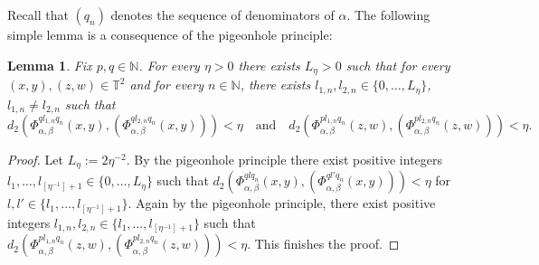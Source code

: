 \documentclass[10pt]{amsart}
\theoremstyle{definition}
\theoremstyle{plain}
\newtheorem{lemma}[definition]{Lemma}
\newcommand\NN{\mathbb{N}}
\newcommand\TT{\mathbb{T}}
\begin{document}
Recall that $(q_n)$ denotes the sequence of denominators of $\alpha$. The following simple lemma is a consequence of the pigeonhole principle:

\begin{lemma}\label{lem:zar} Fix $p,q\in \NN$. For every $\eta>0$ there exists $L_\eta>0$ such that for every $(x,y),(z,w)\in \TT^2$ and for every $n\in \NN$, there exists $l_{1,n},l_{2,n}\in\{0,\ldots,L_\eta\}$, $l_{1,n}\neq l_{2,n}$ such that
\[
d_2(\Phi_{\alpha,\beta}^{ql_{1,n}q_n}(x,y),(\Phi_{\alpha,\beta}^{ql_{2,n}q_n}(x,y)))<\eta \quad \text{and}\quad d_2(\Phi_{\alpha,\beta}^{pl_{1,n}q_n}(z,w),(\Phi_{\alpha,\beta}^{pl_{2,n}q_n}(z,w)))<\eta.
\]
\end{lemma}
\begin{proof} Let $L_\eta:=2\eta^{-2}$. By the pigeonhole principle there exist positive integers $l_1,\ldots,l_{[\eta^{-1}]+1}\in \{0,\ldots,L_\eta\}$ such that $d_2(\Phi_{\alpha,\beta}^{qlq_n}(x,y),(\Phi_{\alpha,\beta}^{ql'q_n}(x,y)))<\eta$ for $l,l'\in\{l_1,\ldots,l_{[\eta^{-1}]+1}\}$. Again by the pigeonhole principle, there exist positive integers $l_{1,n},l_{2,n}\in \{l_1,\ldots,l_{[\eta^{-1}]+1}\}$ such that
$d_2(\Phi_{\alpha,\beta}^{pl_{1,n}q_n}(z,w),(\Phi_{\alpha,\beta}^{pl_{2,n}q_n}(z,w)))<\eta$. This finishes the proof.
\end{proof}
\end{document}
